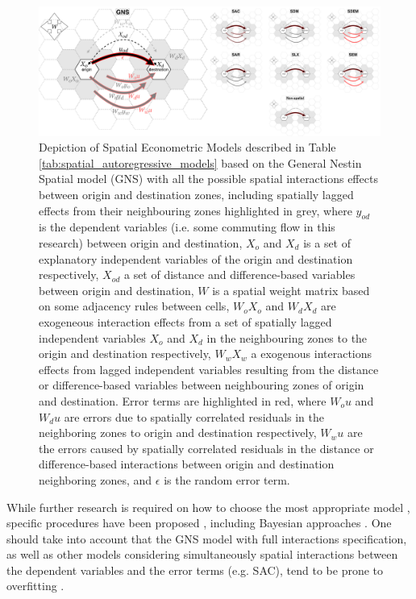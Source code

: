 \begin{figure}[ht!]
    \centering
    \includegraphics[width=1\textwidth]{diagram_interactions_H_nolabels.jpg}
    \caption{Depiction of Spatial Econometric Models described in Table~ \ref{tab:spatial_autoregressive_models} based on the General Nestin Spatial model (GNS) with all the possible spatial interactions effects between origin and destination zones, including spatially lagged effects from their neighbouring zones highlighted in grey, where $y_{od}$ is the dependent variables (i.e. some commuting flow in this research) between origin and destination, $X_o$ and $X_d$ is a set of explanatory independent variables of the origin and destination respectively, $X_{od}$ a set of distance and difference-based variables between origin and destination, $W$ is a spatial weight matrix based on some adjacency rules between cells, $W_o X_o$ and $W_d X_d$ are exogeneous interaction effects from a set of spatially lagged independent variables $X_o$ and $X_d$ in the neighbouring zones to the origin and destination respectively, $W_w X_w$ a exogenous interactions effects from lagged independent variables resulting from the distance or difference-based variables between neighbouring zones of origin and destination. Error terms are highlighted in red, where $W_o u$ and $W_d u$ are errors due to spatially correlated residuals in the neighboring zones to origin and destination respectively, $W_w u$ are the errors caused by spatially correlated residuals in the distance or difference-based interactions between origin and destination neighboring zones, and $\epsilon$ is the random error term.}
    \label{fig:diagram_interactions}
\end{figure}



While further research is required on how to choose the most appropriate model \citep{HalleckVega2015TheModel}, specific procedures have been proposed \citep{Elhorst2014SpatialEconometrics}, including Bayesian approaches \citep{LeSage2014SpatialApproach, LeSage2016AEffects}. One should take into account that the GNS model with full interactions specification, as well as other models considering simultaneously spatial interactions between the dependent variables and the error terms (e.g. SAC), tend to be prone to overfitting \citep{Margaretic2017SpatialFlows}.

